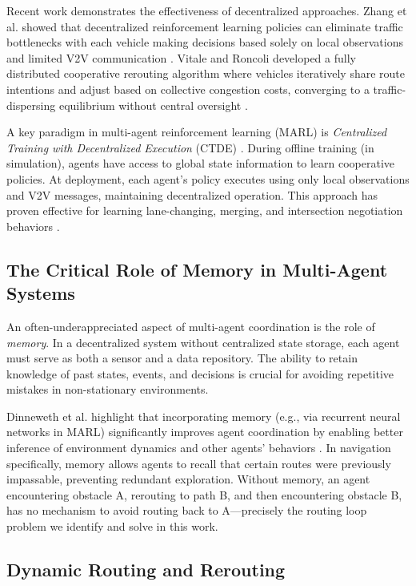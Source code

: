 \documentclass[conference]{IEEEtran}
\begin{document}
Recent work demonstrates the effectiveness of decentralized approaches. Zhang et al. showed that decentralized reinforcement learning policies can eliminate traffic bottlenecks with each vehicle making decisions based solely on local observations and limited V2V communication \cite{zhang2023learning}. Vitale and Roncoli developed a fully distributed cooperative rerouting algorithm where vehicles iteratively share route intentions and adjust based on collective congestion costs, converging to a traffic-dispersing equilibrium without central oversight \cite{vitale2024cooperative}.

A key paradigm in multi-agent reinforcement learning (MARL) is \textit{Centralized Training with Decentralized Execution} (CTDE) \cite{dinneweth2022multi}. During offline training (in simulation), agents have access to global state information to learn cooperative policies. At deployment, each agent's policy executes using only local observations and V2V messages, maintaining decentralized operation. This approach has proven effective for learning lane-changing, merging, and intersection negotiation behaviors \cite{gan2024multi,zhou2022multi}.

\subsection{The Critical Role of Memory in Multi-Agent Systems}

An often-underappreciated aspect of multi-agent coordination is the role of \textit{memory}. In a decentralized system without centralized state storage, each agent must serve as both a sensor and a data repository. The ability to retain knowledge of past states, events, and decisions is crucial for avoiding repetitive mistakes in non-stationary environments.

Dinneweth et al. highlight that incorporating memory (e.g., via recurrent neural networks in MARL) significantly improves agent coordination by enabling better inference of environment dynamics and other agents' behaviors \cite{dinneweth2022multi}. In navigation specifically, memory allows agents to recall that certain routes were previously impassable, preventing redundant exploration. Without memory, an agent encountering obstacle A, rerouting to path B, and then encountering obstacle B, has no mechanism to avoid routing back to A—precisely the routing loop problem we identify and solve in this work.

\subsection{Dynamic Routing and Rerouting}
\end{document}
